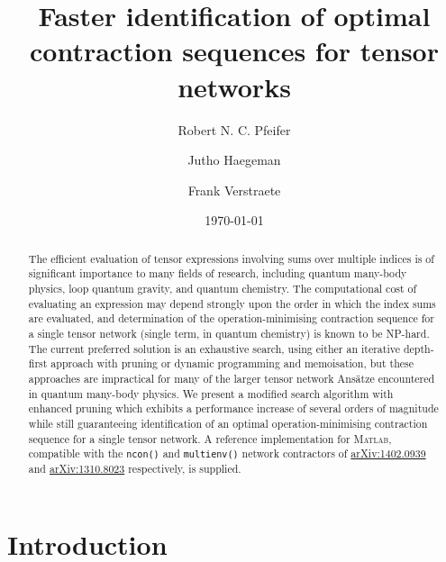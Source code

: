 \documentclass[aps,pre,reprint,superscriptaddress,amsfonts,amsmath,showpacs,nofootinbib,floatfix]{revtex4-1}
\newcommand{\MATLAB}{\textsc{Matlab}}
\newcommand{\ttt}[1]{\texttt{#1}}
\begin{document}
\title{Faster identification of optimal contraction sequences for tensor networks}


\author{Robert N. C. Pfeifer}
\author{Jutho Haegeman}
\author{Frank Verstraete}

\date{\today}

\begin{abstract}
The efficient evaluation of tensor expressions involving sums over multiple indices is of significant importance to many fields of research, including quantum many-body physics, loop quantum gravity, and quantum chemistry. The computational cost of evaluating an expression may depend strongly upon the order in which the index sums are evaluated, and determination of the operation-minimising contraction sequence for a single tensor network (single term, in quantum chemistry) is known to be NP-hard. The current preferred solution is an exhaustive search, using either an iterative depth-first approach with pruning or dynamic programming and memoisation, but these approaches are impractical for many of the larger tensor network Ans\"atze encountered in quantum many-body physics. We present a modified search algorithm with enhanced pruning which exhibits a performance increase of several orders of magnitude while still guaranteeing identification of an optimal operation-minimising contraction sequence for a single tensor network. A reference implementation for \MATLAB{}, compatible with the \ttt{ncon()} and \ttt{multienv()} network contractors of \href{http://arxiv.org/abs/1402.0939}{arXiv:1402.0939} and \href{http://arxiv.org/abs/1310.8023}{arXiv:1310.8023} respectively, is supplied.
\end{abstract}

\pacs{}

\maketitle

\section{Introduction}
\end{document}
